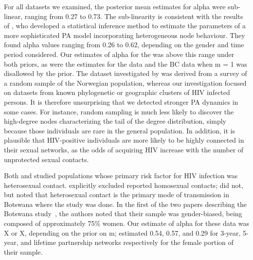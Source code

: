 For all datasets we examined, the posterior mean estimates for \gls{alpha} were
sub-linear, ranging from 
    0.27
to 
    0.73.
The sub-linearity is consistent with the results of
\textcite{de2007preferential}, who developed a statistical inference method to
estimate the parameters of a more sophisticated \acrlong{PA} model
incorporating heterogeneous node behaviour. They found \gls{alpha} values
ranging from 0.26 to 0.62, depending on the gender and time period considered. 
Our estimates of \gls{alpha} for the \textcite{niculescu2015recent} was above
this range under both priors, as were the estimates for the
\textcite{wang2015targeting} data and the BC data when \gls{m} = 1 was
disallowed by the prior. The dataset investigated by
\textcite{de2007preferential} was derived from a survey of a random sample of
the Norwegian population, whereas our investigation focused on datasets from
known phylogenetic or geographic clusters of \gls{HIV} infected persons. It is
therefore unsurprising that we detected stronger \acrlong{PA} dynamics in some
cases. For instance, random sampling is much less likely to discover the
high-degree nodes characterizing the tail of the degree distribution, simply
because those individuals are rare in the general population. In addition, it
is plausible that \gls{HIV}-positive individuals are more likely to be highly
connected in their sexual networks, as the odds of acquiring \gls{HIV} increase
with the number of unprotected sexual contacts.

Both \textcite{de2007preferential} and \textcite{novitsky2014impact} studied
populations whose primary risk factor for \gls{HIV} infection was heterosexual
contact. \citeauthor{de2007preferential} explicitly excluded reported
homosexual contacts; \citeauthor{novitsky2014impact} did not, but noted that
heterosexual contact is the primary mode of transmission in Botswana where the
study was done. In the first of the two papers describing the Botswana
study~\autocite{novitsky2013phylogenetic}, the authors noted that their sample
was gender-biased, being composed of approximately 75\% women. Our estimate of
\gls{alpha} for these data was X or X, depending on the prior on \gls{m};
\citeauthor{de2007preferential} estimated 0.54, 0.57, and 0.29 for 3-year,
5-year, and lifetime partnership networks respectively for the female portion
of their sample.

